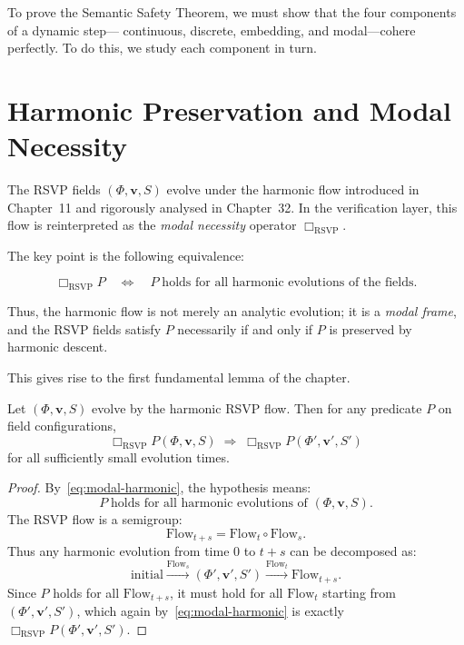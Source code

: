 To prove the Semantic Safety Theorem, we must show that the
four components of a dynamic step—
continuous, discrete, embedding, and modal—cohere perfectly.
To do this, we study each component in turn.

\section{Harmonic Preservation and Modal Necessity}
\label{sec:37-harmonic-preservation}

The RSVP fields $(\Phi,\mathbf{v},S)$ evolve under the harmonic flow
introduced in Chapter~11 and rigorously analysed in Chapter~32.
In the verification layer, this flow is reinterpreted
as the \emph{modal necessity} operator
$\Box_{\mathrm{RSVP}}$.

The key point is the following equivalence:

\begin{equation}
\Box_{\mathrm{RSVP}} P
\quad\Longleftrightarrow\quad
P \;\text{holds for all harmonic evolutions of the fields}.
\label{eq:modal-harmonic}
\end{equation}

Thus, the harmonic flow is not merely an analytic evolution;
it is a \emph{modal frame}, and the RSVP fields satisfy $P$
necessarily if and only if $P$ is preserved by harmonic descent.

This gives rise to the first fundamental lemma of the chapter.

\begin{lemma}
\label{lem:harmonic-preservation}
Let $(\Phi,\mathbf{v},S)$ evolve by the harmonic RSVP flow.
Then for any predicate $P$ on field configurations,
\[
\Box_{\mathrm{RSVP}} P(\Phi,\mathbf{v},S)
\;\Longrightarrow\;
\Box_{\mathrm{RSVP}} P(\Phi',\mathbf{v}',S')
\]
for all sufficiently small evolution times.
\end{lemma}

\begin{proof}
By~\eqref{eq:modal-harmonic}, the hypothesis means:
\[
P \;\text{holds for all harmonic evolutions of }
(\Phi,\mathbf{v},S).
\]
The RSVP flow is a semigroup:
\[
\mathrm{Flow}_{t+s} = \mathrm{Flow}_t \circ \mathrm{Flow}_s.
\]
Thus any harmonic evolution from time $0$ to $t+s$
can be decomposed as:
\[
\mathrm{initial} \xrightarrow{\mathrm{Flow}_s}
(\Phi',\mathbf{v}',S')
\xrightarrow{\mathrm{Flow}_t}
\mathrm{Flow}_{t+s}.
\]
Since $P$ holds for all $\mathrm{Flow}_{t+s}$, it must hold
for all $\mathrm{Flow}_t$ starting from $(\Phi',\mathbf{v}',S')$,
which again by~\eqref{eq:modal-harmonic} is exactly
$\Box_{\mathrm{RSVP}} P(\Phi',\mathbf{v}',S')$.
\end{proof}


